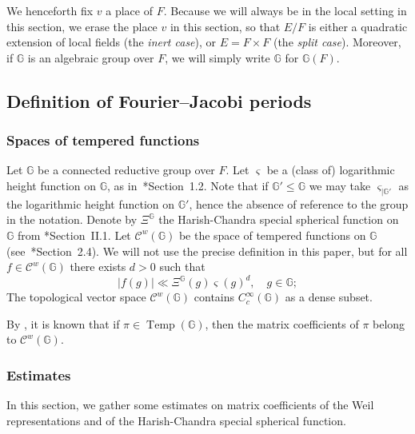 \documentclass[letterpaper,11pt]{amsart}
\newcommand{\bG}{\mathbb{G}}
\newcommand{\cC}{\mathcal{C}}
\newcommand{\<}{\negthickspace}
\newcommand{\valP}[1]{\left|#1\right|}
\DeclareMathOperator{\Temp}{Temp} \DeclareMathOperator{\temp}{temp}
\theoremstyle{definition}
\theoremstyle{plain}
\theoremstyle{remark}
\numberwithin{equation}{section}
\begin{document}
We henceforth fix $v$ a place of $F$. Because we will always be in the local setting in this section, we erase the place $v$ in this section, so that $E/F$ is either a quadratic extension of local fields (the \emph{inert case}), or $E=F \times F$ (the \emph{split case}). Moreover, if $\bG$ is an algebraic group over $F$, we will simply write $\bG$ for $\bG(F)$.

\subsection{Definition of Fourier--Jacobi periods}
\label{sec:FJ_periods}

\subsubsection{Spaces of tempered functions}
\label{subsubsec:Harish_Chandra_Schwartz}
Let $\bG$ be a connected reductive group over $F$. Let $\varsigma$ be a (class of) logarithmic height function on $\bG$, as in~\cite{BP2}*{Section~1.2}. Note that if $\bG' \leq \bG$ we may take $\varsigma_{| \bG'}$ as the logarithmic height function on $\bG'$, hence the absence of reference to the group in the notation. Denote by $\Xi^\bG$ the Harish-Chandra special spherical function on $\bG$ from \cite{Wald}*{Section~II.1}. Let $\cC^w(\bG)$ be the space of tempered functions on $\bG$ (see~\cite{BP1}*{Section~2.4}). We will not use the precise definition in this paper, but for all $f \in \cC^w(\bG)$ there exists $d>0$ such that 
  \begin{equation}
        \label{eq:HC_Schwartz}
            \valP{f(g)} \ll \Xi^\bG(g) \varsigma(g)^{d}, \quad g \in \bG;
    \end{equation}
The topological vector space $\cC^w(\bG)$ contains $C_c^\infty(\bG)$ as a dense subset.

By \cite{CHH88}, it is known that if $\pi \in \Temp(\bG)$, then the matrix coefficients of $\pi$ belong to $\cC^w(\bG)$.

\subsubsection{Estimates}
\label{subsec:Defi_FJ_periods}

In this section, we gather some estimates on matrix coefficients of the Weil representations and of the Harish-Chandra special spherical function.
\end{document}
